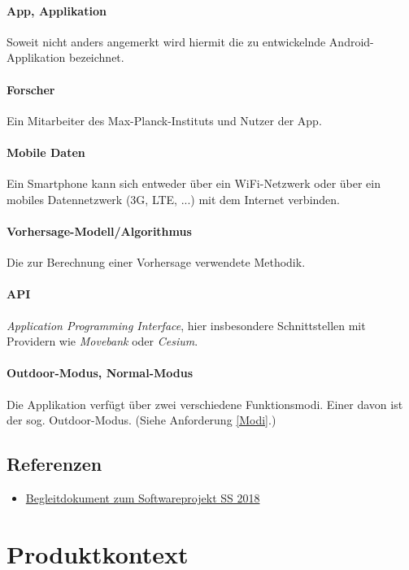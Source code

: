 \documentclass[12pt]{article} %
\begin{document}
\paragraph{App, Applikation} Soweit nicht anders angemerkt wird hiermit die zu entwickelnde Android-Applikation bezeichnet.
 \paragraph{Forscher} Ein Mitarbeiter des Max-Planck-Instituts und Nutzer der App.
 \paragraph{Mobile Daten} Ein Smartphone kann sich entweder über ein WiFi-Netzwerk oder über ein mobiles Datennetzwerk (3G, LTE, ...) mit dem Internet verbinden. 
\paragraph{Vorhersage-Modell/Algorithmus} Die zur Berechnung einer Vorhersage verwendete Methodik. 
\paragraph{API} \textit{Application Programming Interface}, hier insbesondere Schnittstellen mit Providern wie \textit{Movebank} oder \textit{Cesium}. 
\paragraph{Outdoor-Modus, Normal-Modus} Die Applikation verfügt über zwei verschiedene Funktionsmodi. Einer davon ist der sog. Outdoor-Modus. (Siehe Anforderung \ref{Modi}.)

\subsection{Referenzen}

\begin{itemize} 
 	 \item  \href{https://docs.google.com/document/d/1Yc2f18JFaHyhrgM2h2WiATQ0zVmZnsc9W1ImhwWJF-g/edit?usp=sharing}{Begleitdokument zum Softwareprojekt SS 2018}
\end{itemize} 




\newpage
\section{Produktkontext} \label{kontext}
\end{document}
